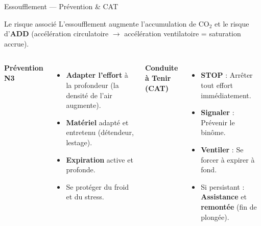 \begin{frame}{Essoufflement — Prévention \& CAT}
    \begin{block}{Le risque associé}
        L'essoufflement augmente l'accumulation de CO$_2$ et le risque d'\textbf{ADD} 
        (accélération circulatoire $\rightarrow$ accélération ventilatoire = saturation accrue).
    \end{block}

    \vspace{0.5em}
    \begin{columns}[T,totalwidth=\textwidth]
        \textbf{\textcolor{ffessmred}{Prévention N3}}
        \begin{itemize}
            \item \textbf{Adapter l'effort} à la profondeur (la densité de l'air augmente).
            \item \textbf{Matériel} adapté et entretenu (détendeur, lestage).
            \item \textbf{Expiration} active et profonde.
            \item Se protéger du froid et du stress.
        \end{itemize}

        \textbf{\textcolor{ffessmred}{Conduite à Tenir (CAT)}}
        \begin{itemize}
            \item \textbf{\textcolor{ffessmred}{STOP}} : Arrêter tout effort immédiatement.
            \item \textbf{\textcolor{ffessmred}{Signaler}} : Prévenir le binôme.
            \item \textbf{\textcolor{ffessmred}{Ventiler}} : Se forcer à expirer à fond.
            \item Si persistant : \textbf{Assistance} et \textbf{remontée} (fin de plongée).
        \end{itemize}
    \end{columns}
\end{frame}

